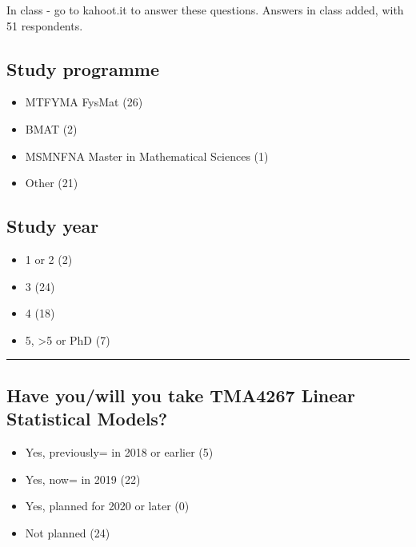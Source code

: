 \documentclass[]{article}
\providecommand{\tightlist}{%
  \setlength{\itemsep}{0pt}\setlength{\parskip}{0pt}}
\begin{document}
In class - go to kahoot.it to answer these questions. Answers in class
added, with 51 respondents.

\hypertarget{study-programme}{%
\subsection{Study programme}\label{study-programme}}

\begin{itemize}
\tightlist
\item
  MTFYMA FysMat (26)
\item
  BMAT (2)
\item
  MSMNFNA Master in Mathematical Sciences (1)
\item
  Other (21)
\end{itemize}

\hypertarget{study-year}{%
\subsection{Study year}\label{study-year}}

\begin{itemize}
\tightlist
\item
  1 or 2 (2)
\item
  3 (24)
\item
  4 (18)
\item
  5, \textgreater{}5 or PhD (7)
\end{itemize}

\begin{center}\rule{0.5\linewidth}{\linethickness}\end{center}

\hypertarget{have-youwill-you-take-tma4267-linear-statistical-models}{%
\subsection{Have you/will you take TMA4267 Linear Statistical
Models?}\label{have-youwill-you-take-tma4267-linear-statistical-models}}

\begin{itemize}
\tightlist
\item
  Yes, previously= in 2018 or earlier (5)
\item
  Yes, now= in 2019 (22)
\item
  Yes, planned for 2020 or later (0)
\item
  Not planned (24)
\end{itemize}
\end{document}
